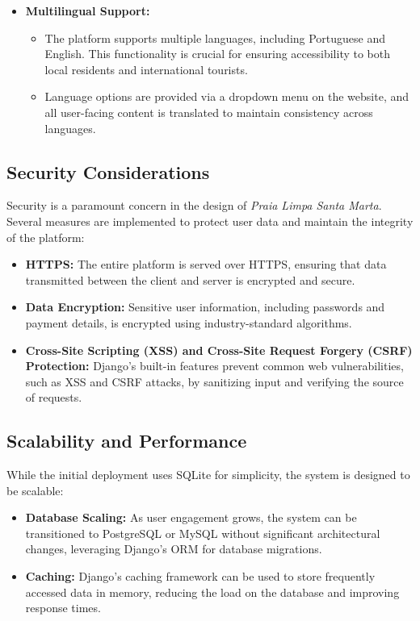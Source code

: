 \begin{itemize}
    \item \textbf{Multilingual Support:}
    \begin{itemize}
        \item The platform supports multiple languages, including Portuguese and English. This functionality is crucial for ensuring accessibility to both local residents and international tourists.
        \item Language options are provided via a dropdown menu on the website, and all user-facing content is translated to maintain consistency across languages.
    \end{itemize}
\end{itemize}

\subsection{Security Considerations}

Security is a paramount concern in the design of \textit{Praia Limpa Santa Marta}. Several measures are implemented to protect user data and maintain the integrity of the platform:

\begin{itemize}
    \item \textbf{HTTPS:} The entire platform is served over HTTPS, ensuring that data transmitted between the client and server is encrypted and secure.
    \item \textbf{Data Encryption:} Sensitive user information, including passwords and payment details, is encrypted using industry-standard algorithms.
    \item \textbf{Cross-Site Scripting (XSS) and Cross-Site Request Forgery (CSRF) Protection:} Django’s built-in features prevent common web vulnerabilities, such as XSS and CSRF attacks, by sanitizing input and verifying the source of requests.
\end{itemize}

\subsection{Scalability and Performance}

While the initial deployment uses SQLite for simplicity, the system is designed to be scalable:

\begin{itemize}
    \item \textbf{Database Scaling:} As user engagement grows, the system can be transitioned to PostgreSQL or MySQL without significant architectural changes, leveraging Django’s ORM for database migrations.
    \item \textbf{Caching:} Django’s caching framework can be used to store frequently accessed data in memory, reducing the load on the database and improving response times.
\end{itemize}

